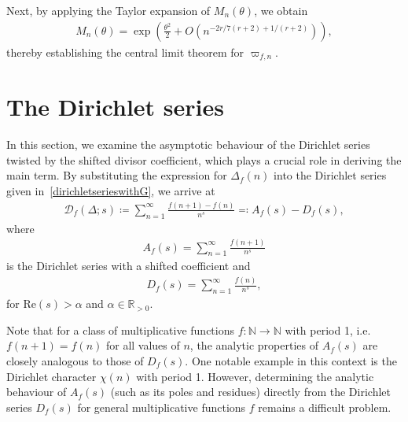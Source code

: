 \documentclass[12pt, oneside,reqno]{amsart}
\numberwithin{equation}{section}
\begin{document}
\noindent
Next, by applying the Taylor expansion of $M_n(\theta)$, we obtain
\begin{align*}
M_n(\theta)
=\exp\left(\frac{\theta^2}{2}+O(n^{-2r/7(r+2)+1/(r+2)})\right),
\end{align*}
thereby establishing the central limit theorem for $\varpi_{f,n}$.

\section{The Dirichlet series}

In this section, we examine the asymptotic behaviour of the Dirichlet series twisted by the shifted divisor coefficient, which plays a crucial role in deriving the main term. By substituting the expression for $\Delta_f(n)$ into the Dirichlet series given in~\eqref{dirichletserieswithG}, we arrive at
\begin{align}\label{shiteddirichletseries}
\mathcal{D}_f(\Delta;s)
\coloneqq\sum_{n=1}^{\infty}\frac{f(n+1)-f(n)}{n^s}
\eqqcolon A_f(s)-D_f(s),
\end{align}
where 
\begin{align}\label{shifteddirichletseries}
A_f(s)
=\sum_{n=1}^{\infty}\frac{f(n+1)}{n^s}
\end{align}
is the Dirichlet series with a shifted coefficient and 
\begin{align}\label{dirichletseriesdefinition}
D_{f}(s)
=\sum_{n=1}^{\infty}\frac{f(n)}{n^s},
\end{align}
for $\mathrm{Re}(s)>\alpha$ and $\alpha\in\mathbb{R}_{>0}$.

\medskip

Note that for a class of multiplicative functions $f:\mathbb{N}\to\mathbb{N}$ with period 1, i.e. $f(n+1)=f(n)$ for all values of $n$, the analytic properties of $A_f(s)$ are closely analogous to those of $D_f(s)$. One notable example in this context is the Dirichlet character $\chi(n)$ with period 1.  However, determining the analytic behaviour of $A_f(s)$ (such as its poles and residues) directly from the Dirichlet series $D_f(s)$ for general multiplicative functions $f$ remains a difficult problem.
\medskip
\end{document}
